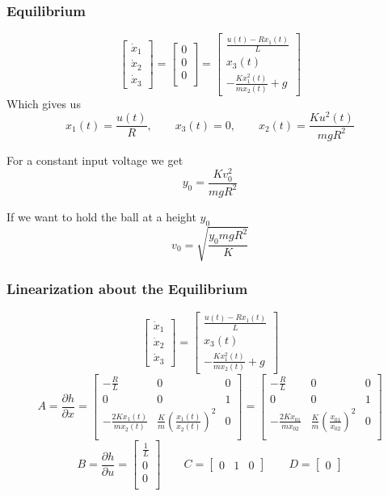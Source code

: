 \documentclass{beamer}
\begin{document}
\begin{frame}
\frametitle{Equilibrium}
$$
\begin{bmatrix}
\dot{x}_1 \\
\dot{x}_2 \\
\dot{x}_3
\end{bmatrix}
=
\begin{bmatrix}
0 \\
0 \\
0 \\
\end{bmatrix}
=
\begin{bmatrix}
\frac{u(t)-Rx_1(t)}{L} \\
x_3(t) \\
-\frac{Kx_1^2(t)}{mx_2(t)} + g
\end{bmatrix}
$$
Which gives us
$$ x_1(t) = \frac{u(t)}{R}, \qquad x_3(t) = 0, \qquad x_2(t) = \frac{Ku^2(t)}{mgR^2} $$
\begin{minipage}{.45\textwidth}
    For a constant input voltage we get
    $$ y_0 = \frac{Kv_0^2}{mgR^2} $$
\end{minipage}
\hfill
\begin{minipage}{.45\textwidth}
    If we want to hold the ball at a height $y_0$
    $$ v_0 = \sqrt{\frac{y_0mgR^2}{K}} $$
\end{minipage}%
\end{frame}

\begin{frame}
\frametitle{Linearization about the Equilibrium}
$$
\begin{bmatrix}
\dot{x}_1 \\
\dot{x}_2 \\
\dot{x}_3
\end{bmatrix}
=
\begin{bmatrix}
\frac{u(t)-Rx_1(t)}{L} \\
x_3(t) \\
-\frac{Kx_1^2(t)}{mx_2(t)} + g
\end{bmatrix}
$$
$$
A
=
\frac{\partial h}{\partial x}
=
\begin{bmatrix}
-\frac{R}{L} & 0 & 0\\
0 & 0 & 1\\
-\frac{2Kx_1(t)}{mx_2(t)} & \frac{K}{m}(\frac{x_1(t)}{x_2(t)})^2 & 0\\
\end{bmatrix}
=
\begin{bmatrix}
-\frac{R}{L} & 0 & 0\\
0 & 0 & 1\\
-\frac{2Kx_{01}}{mx_{02}} & \frac{K}{m}(\frac{x_{01}}{x_{02}})^2 & 0\\
\end{bmatrix}
$$
$$
B
=
\frac{\partial h}{\partial u}
=
\begin{bmatrix}
\frac{1}{L} \\
0 \\
0 \\
\end{bmatrix}
\qquad
C
=
\begin{bmatrix}
0 & 1 & 0
\end{bmatrix}
\qquad
D
=
\begin{bmatrix}
0
\end{bmatrix}
$$
\end{frame}
\end{document}
